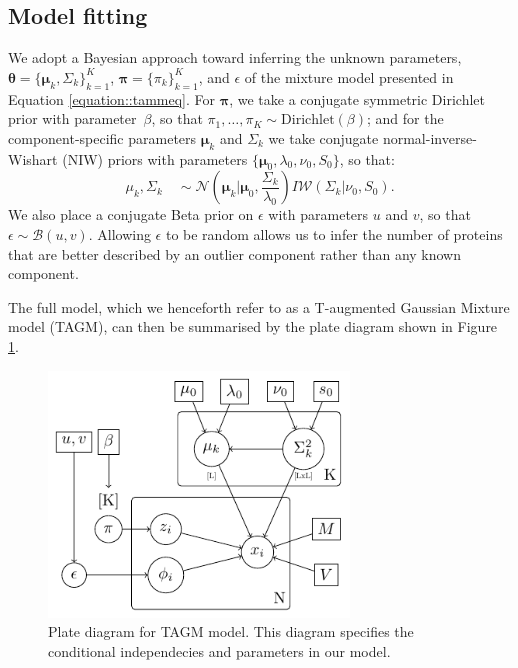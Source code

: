 \documentclass[12pt,english]{article}\usepackage[]{graphicx}\usepackage[]{color}
\begin{document}
\subsection{Model fitting}
We adopt a Bayesian approach toward inferring the unknown parameters, $\boldsymbol{\theta} = \{\boldsymbol{\mu}_k, \Sigma_k \}_{k = 1}^K$, $\boldsymbol{\pi} = \{\pi_k\}_{k = 1}^K$, and $\epsilon$ of the mixture model presented in Equation \eqref{equation::tammeq}.  For $\boldsymbol{\pi}$, we take a conjugate symmetric Dirichlet prior with parameter~$\beta$, so that $\pi_1, \ldots, \pi_K \sim \mbox{Dirichlet}(\beta)$; and for the component-specific parameters $\boldsymbol{\mu}_k$ and $\Sigma_k$ we take conjugate normal-inverse-Wishart (NIW) priors with parameters $\{\boldsymbol{\mu}_0, \lambda_0, \nu_0, S_0\}$, so that:
\begin{equation} \label{equation::prior}
  \mu_k, \Sigma_k \quad \sim \mathcal{N}\left(\boldsymbol{\mu}_k|\boldsymbol{\mu}_0, \frac{\Sigma_{k}}{\lambda_0}\right)I\mathcal{W}\left(\Sigma_{k}|\nu_0, S_0\right).
\end{equation}
We also place a conjugate Beta prior on $\epsilon$ with parameters $u$ and $v$, so that $\epsilon \sim \mathcal{B}(u,v)$.
Allowing $\epsilon$ to be random allows us to infer the number of proteins that are
better described by an outlier component rather than any known component.

The full model, which we henceforth refer to as a T-augmented Gaussian Mixture model (TAGM), can then be summarised by
the plate diagram shown in Figure \ref{plateDiagram}.

\begin{figure}[H]
  \includegraphics[width=8cm]{graphmodel2.pdf}
  \centering
  \caption{Plate diagram for TAGM model. This diagram specifies the conditional independecies and parameters in our model.}\label{plateDiagram}
\end{figure}
\end{document}
